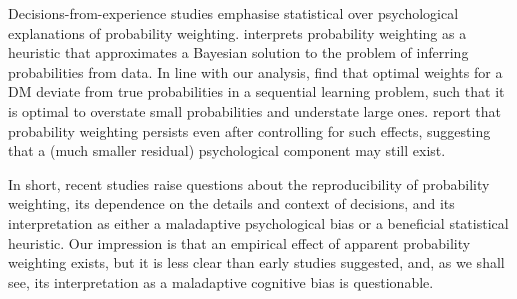 \documentclass[12pt,letter,timesnewroman]{article}
\newcommand{\seclabel}[1]{\label{sec:#1}}
\newcommand{\MK}[1]{\textcolor{red}{\textit{***MK: #1 MK***}}}
\begin{document}
Decisions-from-experience studies emphasise statistical over psychological explanations of probability weighting. \textcite{Martins2006} interprets probability weighting as a heuristic that approximates a Bayesian solution to the problem of inferring probabilities from data. In line with our analysis, \textcite{SeoETAL2019} find that optimal weights for a DM deviate from true probabilities in a sequential learning problem, such that it is optimal to overstate small probabilities and understate large ones. \textcite{FoxHadar2006,UngemachETAL2009} report that probability weighting persists even after controlling for such effects, suggesting that a (much smaller residual) psychological component may still exist.

In short, recent studies raise questions about the reproducibility of probability weighting, its dependence on the details and context of decisions, and its interpretation as either a maladaptive psychological bias or a beneficial statistical heuristic. Our impression is that an empirical effect of apparent probability weighting exists, but it is less clear than early studies suggested, and, as we shall see, its interpretation as a maladaptive cognitive bias is questionable.


\end{document}
